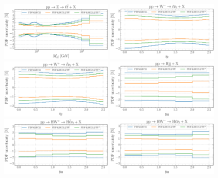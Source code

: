\begin{figure}[htbp]
	\centering
	\includegraphics[width=0.49\textwidth]{plots/LHCpheno/NNPDF_DY_14TEV_40_PHENO-global-pdf4lhc21.pdf}
	\includegraphics[width=0.49\textwidth]{plots/LHCpheno/NNPDF_WM_14TEV_40_PHENO-global-pdf4lhc21.pdf}
	\includegraphics[width=0.49\textwidth]{plots/LHCpheno/NNPDF_WP_14TEV_40_PHENO-global-pdf4lhc21.pdf}
	\includegraphics[width=0.49\textwidth]{plots/LHCpheno/NNPDF_HVBF_14TEV_40_PHENO-global-pdf4lhc21.pdf}
	\includegraphics[width=0.49\textwidth]{plots/LHCpheno/NNPDF_HWP_14TEV_40_PHENO-global-pdf4lhc21.pdf}
	\includegraphics[width=0.49\textwidth]{plots/LHCpheno/NNPDF_HWM_14TEV_40_PHENO-global-pdf4lhc21.pdf}

\end{figure}
